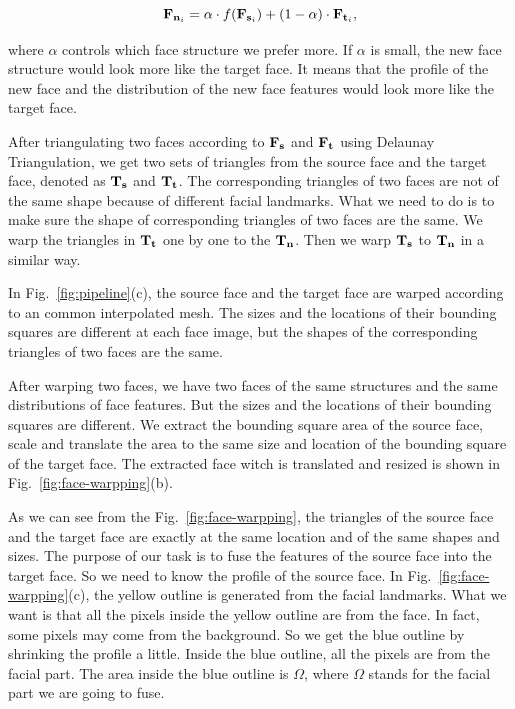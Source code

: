 \begin{equation}
\label{eq:inp-point}
\mathbf{F}_{\mathbf{n}_i} = \alpha \cdot f(\mathbf{F}_{\mathbf{s}_i}) + (1-\alpha) \cdot \mathbf{F}_{\mathbf{t}_i},
\end{equation}

where $\alpha$ controls which face structure we prefer more. If $\alpha$ is small, the new face structure would look more like the target face. It means that the profile of the new face and the distribution of the new face features would look more like the target face.

After triangulating two faces according to $\mathbf{F_s}$ and $\mathbf{F_t}$ using Delaunay Triangulation, we get two sets of triangles from the source face and the target face, denoted as $\mathbf{T_s}$ and $\mathbf{T_t}$. The corresponding triangles of two faces are not of the same shape because of different facial landmarks. What we need to do is to make sure the shape of corresponding triangles of two faces are the same. We warp the triangles in $\mathbf{T_{t}}$ one by one to the $\mathbf{T_{n}}$. Then we warp $\mathbf{T_s}$ to $\mathbf{T_n}$ in a similar way.

In Fig.~\ref{fig:pipeline}(c), the source face and the target face are warped according to an common interpolated mesh. The sizes and the locations of their bounding squares are different at each face image, but the shapes of the corresponding triangles of two faces are the same.

After warping two faces, we have two faces of the same structures and the same distributions of face features. But the sizes and the locations of their bounding squares are different. We extract the bounding square area of the source face, scale and translate the area to the same size and location of the bounding square of the target face. The extracted face witch is translated and resized is shown in Fig.~\ref{fig:face-warpping}(b).

As we can see from the Fig.~\ref{fig:face-warpping}, the triangles of the source face and the target face are exactly at the same location and of the same shapes and sizes. The purpose of our task is to fuse the features of the source face into the target face. So we need to know the profile of the source face. In Fig.~\ref{fig:face-warpping}(c), the yellow outline is generated from the facial landmarks. What we want is that all the pixels inside the yellow outline are from the face. In fact, some pixels may come from the background. So we get the blue outline by shrinking the profile a little. Inside the blue outline, all the pixels are from the facial part. The area inside the blue outline is $\Omega$, where $\Omega$ stands for the facial part we are going to fuse.

